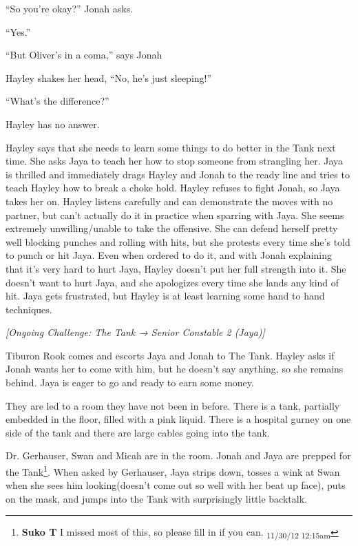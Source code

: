 ``So you're okay?'' Jonah asks.

``Yes.''

``But Oliver's in a coma,'' says Jonah

Hayley shakes her head, ``No, he's just sleeping!''

``What's the difference?''

Hayley has no answer.



Hayley says that she needs to learn some things to do better in the Tank next time.  She asks Jaya to teach her how to stop someone from strangling her.  Jaya is thrilled and immediately drags Hayley and Jonah to the ready line and tries to teach Hayley how to break a choke hold.  Hayley refuses to fight Jonah, so Jaya takes her on.  Hayley listens carefully and can demonstrate the moves with no partner, but can't actually do it in practice when sparring with Jaya.  She seems extremely unwilling/unable to take the offensive. She can defend herself pretty well blocking punches and rolling with hits, but she protests every time she's told to punch or hit Jaya.    Even when ordered to do it, and with Jonah explaining that it's very hard to hurt Jaya, Hayley doesn't put her full strength into it.  She doesn't want to hurt Jaya, and she apologizes every time she lands any kind of hit.  Jaya gets frustrated, but Hayley is at least learning some hand to hand techniques.  



\textit{{[}Ongoing Challenge: The Tank → Senior Constable 2 (Jaya){]}}



Tiburon Rook comes and escorts Jaya and Jonah to The Tank.  Hayley asks if Jonah wants her to come with him, but he doesn't say anything, so she remains behind.  Jaya is eager to go and ready to earn some money.



They are led to a room they have not been in before.  There is a tank, partially embedded in the floor, filled with a pink liquid.  There is a hospital gurney on one side of the tank and there are large cables going into the tank.



Dr. Gerhauser, Swan and Micah are in the room.  Jonah and Jaya are prepped for the Tank\footnote{\textbf{Suko T }I missed most of this, so please fill in if you can. \textsubscript{11/30/12 12:15am}}.  When asked by Gerhauser, Jaya strips down, tosses a wink at Swan when she sees him looking(doesn't come out so well with her beat up face), puts on the mask, and jumps into the Tank with surprisingly little backtalk.  





